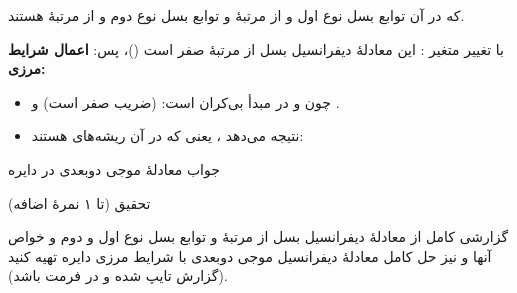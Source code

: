 

که در آن  توابع بسل نوع اول و از مرتبهٔ  و  توابع بسل نوع دوم و از مرتبهٔ  هستند.


با تغییر متغیر :
این معادلهٔ دیفرانسیل بسل از مرتبهٔ صفر است ()، پس:
\textbf{اعمال شرایط مرزی:}

\begin{itemize}
\tightlist
\item
  چون  و  در مبدأ بی‌کران است:  (ضریب  صفر است) و .
\item
   نتیجه می‌دهد ، یعنی  که در آن  ریشه‌های  هستند:
\end{itemize}



\begin{EMimportant}{جواب معادلهٔ موجی دو‌بعدی در دایره}


\end{EMimportant}

\begin{EMremark}{تحقیق (تا ۱ نمرهٔ اضافه)}

گزارشی کامل از معادلهٔ دیفرانسیل بسل از مرتبهٔ  و توابع بسل نوع اول و دوم و خواص آنها و نیز حل کامل معادلهٔ دیفرانسیل موجی دوبعدی با شرایط مرزی دایره تهیه کنید (گزارش تایپ شده و در فرمت  باشد).

\end{EMremark}
